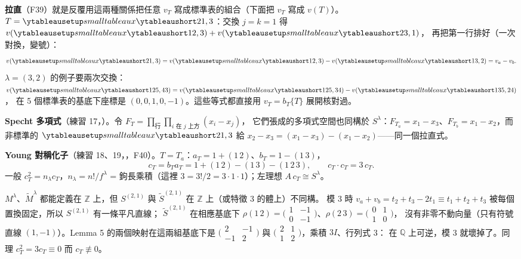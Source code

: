 \textbf{拉直}（F39）就是反覆用這兩種關係把任意 $v_T$ 寫成標準表的組合（下面把 $v_T$ 寫成 $v(T)$）。$T=\yts{21,3}$：交換 $j=k=1$ 得 $v(\yts{12,3})+v(\yts{23,1})$，
再把第一行排好（一次對換，變號）：
\[
v(\yts{21,3})=v(\yts{12,3})-v(\yts{13,2})=v_a-v_b .
\]
$\lambda=(3,2)$ 的例子要兩次交換：$v(\yts{125,43})=v(\yts{125,34})-v(\yts{135,24})$，
在 5 個標準表的基底下座標是 $(0,0,1,0,-1)$。這些等式都直接用 $v_T=b_T\{T\}$ 展開核對過。

\textbf{Specht 多項式}（練習 17，）。令 $F_T=\prod_{\text{行}}\prod_{i\text{ 在 }j\text{ 上方}}(x_i-x_j)$，
它們張成的多項式空間也同構於 $S^\lambda$：$F_{T_a}=x_1-x_3$、$F_{T_b}=x_1-x_2$，而非標準的 $\yts{21,3}$ 給 $x_2-x_3=(x_1-x_3)-(x_1-x_2)$——同一個拉直式。

\textbf{Young 對稱化子}（練習 18、19，，F40）。$T=T_a$：$a_T=1+(1\,2)$、$b_T=1-(1\,3)$，
\[
c_T=b_Ta_T=1+(1\,2)-(1\,3)-(1\,2\,3),\qquad c_T\cdot c_T=3\,c_T .
\]
一般 $c_T^2=n_\lambda c_T$，$n_\lambda=n!/f^\lambda$ = 鉤長乘積（這裡 $3=3!/2=3\cdot1\cdot1$）；左理想 $A\,c_T\cong S^\lambda$。

\begin{notebox}
$M^\lambda$、$\widetilde M^\lambda$ 都能定義在 $\mathbb Z$ 上，但 $S^{(2,1)}$ 與 $\widetilde S^{(2,1)}$ 在 $\mathbb Z$ 上（或特徵 3 的體上）不同構。
模 3 時 $v_a+v_b=t_2+t_3-2t_1\equiv t_1+t_2+t_3$ 被每個置換固定，所以 $S^{(2,1)}$ 有一條平凡直線；
$\widetilde S^{(2,1)}$ 在相應基底下 $\rho(1\,2)=\bigl(\begin{smallmatrix}1&-1\\0&-1\end{smallmatrix}\bigr)$、$\rho(2\,3)=\bigl(\begin{smallmatrix}0&1\\1&0\end{smallmatrix}\bigr)$，
沒有非零不動向量（只有符號直線 $(1,-1)$）。Lemma 5 的兩個映射在這兩組基底下是
$\bigl(\begin{smallmatrix}2&-1\\-1&2\end{smallmatrix}\bigr)$ 與 $\bigl(\begin{smallmatrix}2&1\\1&2\end{smallmatrix}\bigr)$，乘積 $3I$、行列式 3：
在 $\mathbb Q$ 上可逆，模 3 就壞掉了。同理 $c_T^2=3c_T\equiv0$ 而 $c_T\not\equiv0$。
\end{notebox}

